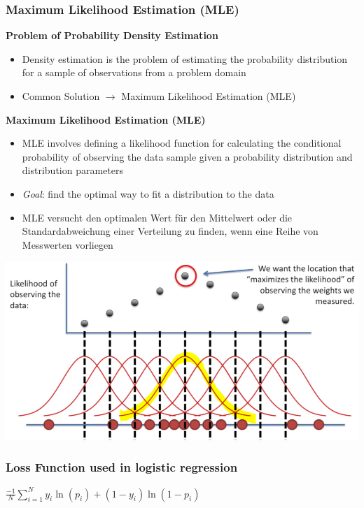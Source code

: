 \subsubsection{Maximum Likelihood Estimation (MLE)}
\textbf{Problem of Probability Density Estimation}
\begin{itemize}
    \item Density estimation is the problem of estimating the probability distribution for a sample of observations from a problem domain
    \item Common Solution $\rightarrow$ Maximum Likelihood Estimation (MLE)
\end{itemize}
\textbf{Maximum Likelihood Estimation (MLE)}
\begin{itemize}
    \item MLE involves defining a likelihood function for calculating the conditional probability of observing the data sample given a probability distribution and distribution parameters
    \item \textit{Goal}: find the optimal way to fit a distribution to the data
    \item MLE versucht den optimalen Wert für den Mittelwert oder die Standardabweichung einer Verteilung zu finden, wenn eine Reihe von Messwerten vorliegen
\end{itemize}
\includegraphics[width=\linewidth]{./img/mle.png}

\subsubsection{Loss Function used in logistic regression}
\begin{center}
    $\frac{-1}{N}\displaystyle\sum_{i = 1}^{N} y_i \ln(p_i) + (1 - y_i) \ln(1 - p_i)$
\end{center}

